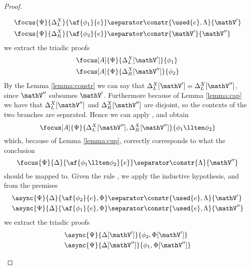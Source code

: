 \begin{proof}
\begin{itemize}
			\begin{align*}
				&\focus{\Psi}{\Delta_L^X}{\af{\phi_1}{e}} \separator \constr{\used{e}, \Lambda}{\mathV'} \\
				&\focus{\Psi}{\Delta_R^X}{\af{\phi_2}{e}} \separator \constr{\mathV'}{\mathV''} 
			\end{align*}
			we extract the triadic proofs
			\begin{align*}
				&\focus[A]{\Psi}{\Delta_L^X[\mathV']}{\phi_1} \\
				&\focus[A]{\Psi}{\Delta_R^X[\mathV'']}{\phi_2} 
			\end{align*}
			By the Lemma \ref{lemma:constr} we can say that $\Delta_L^X[\mathV'] = \Delta_L^X[\mathV'']$, since $\mathV''$ subsumes $\mathV'$.
			Furthermore because of Lemma \ref{lemma:cap} we have that $\Delta_L^X[\mathV'']$ and $\Delta_R^X[\mathV'']$ are disjoint, so the contexts of the two branches are separated.
			Hence we can apply \derRule[A]{\displayten}, and obtain
			$$ \focus[A]{\Psi}{\Delta_L^X[\mathV''], \Delta_R^X[\mathV'']}{\phi_1 \llten \phi_2} $$
			which, because of Lemma \ref{lemma:cup}, correctly corresponds to what the conclusion
			$$ \focus{\Psi}{\Delta}{\af{\phi_1 \llten \phi_2}{e}} \separator \constr{\Lambda}{\mathV''} $$
			should be mapped to.
		\indCase{\displaywith} Given the rule \derRule{\displaywith}, we apply the inductive hypothesis, and from the premises 
			\begin{align*}
				&\async{\Psi}{\Delta}{\af{\phi_2}{e}, \Phi} \separator \constr{\used{e}, \Lambda}{\mathV'} \\
				&\async{\Psi}{\Delta}{\af{\phi_1}{e}, \Phi} \separator \constr{\used{e}, \Lambda}{\mathV''} 
			\end{align*}
			we extract the triadic proofs
			\begin{align*}
				&\async{\Psi}{\Delta[\mathV']}{\phi_2, \Phi[\mathV']} \\
				&\async{\Psi}{\Delta[\mathV'']}{\phi_1, \Phi[\mathV'']}
			\end{align*}

\end{itemize}
\end{proof}
